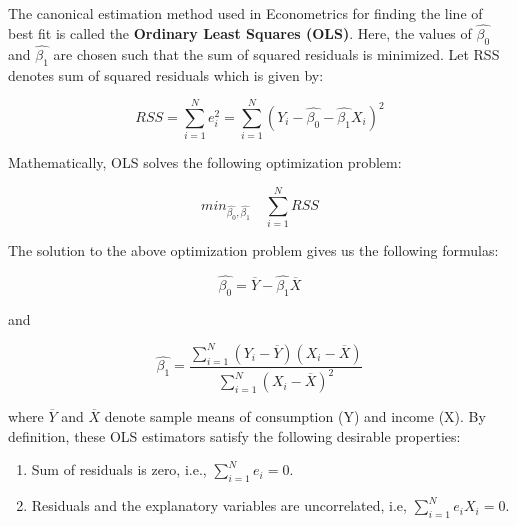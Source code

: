 \documentclass[
]{book}
\theoremstyle{definition}
\theoremstyle{definition}
\theoremstyle{definition}
\theoremstyle{definition}
\theoremstyle{remark}
\begin{document}
The canonical estimation method used in Econometrics for finding the line of best fit is called the \textbf{Ordinary Least Squares (OLS)}. Here, the values of \(\hat{\beta_0}\) and \(\hat{\beta_1}\) are chosen such that the sum of squared residuals is minimized. Let RSS denotes sum of squared residuals which is given by:

\[RSS=\sum_{i=1}^{N} e_i^2=\sum_{i=1}^{N}(Y_i- \hat{\beta_0} - \hat{\beta_1} X_i)^2\]

Mathematically, OLS solves the following optimization problem:

\[min_{\hat{\beta_0}, \hat{\beta_1}} \quad \sum_{i=1}^N RSS\]

The solution to the above optimization problem gives us the following formulas:

\[\hat{\beta_0}= \overline{Y} - \hat{\beta_1}\overline{X}\]

and

\[\hat{\beta_1}=\frac{\sum_{i=1}^N (Y_i-\overline{Y})(X_i-\overline{X})}{\sum_{i=1}^N(X_i-\overline{X})^2}\]

where \(\overline{Y}\) and \(\overline{X}\) denote sample means of consumption (Y) and income (X). By definition, these OLS estimators satisfy the following desirable properties:

\begin{enumerate}
\def\labelenumi{\arabic{enumi}.}
\item
  Sum of residuals is zero, i.e., \(\sum_{i=1}^N e_i=0\).
\item
  Residuals and the explanatory variables are uncorrelated, i.e, \(\sum_{i=1}^N e_iX_i=0\).
\end{enumerate}
\end{document}
